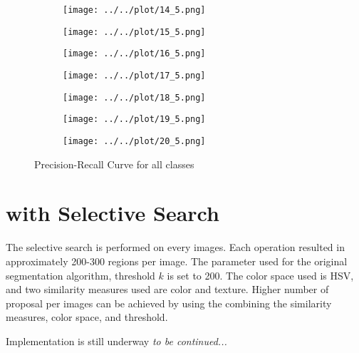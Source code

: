 \documentclass{article}
\begin{document}
\begin{figure}[H]
\begin{subfigure}[h]{0.2\textwidth}
		\texttt{[image: ../../plot/14\_5.png]}
	\end{subfigure}
	\begin{subfigure}[h]{0.2\textwidth}
		\texttt{[image: ../../plot/15\_5.png]}
	\end{subfigure}
	\begin{subfigure}[h]{0.2\textwidth}
		\texttt{[image: ../../plot/16\_5.png]}
	\end{subfigure}
	\begin{subfigure}[h]{0.2\textwidth}
		\texttt{[image: ../../plot/17\_5.png]}
	\end{subfigure}
	\begin{subfigure}[h]{0.2\textwidth}
		\texttt{[image: ../../plot/18\_5.png]}
	\end{subfigure}
	\begin{subfigure}[h]{0.2\textwidth}
		\texttt{[image: ../../plot/19\_5.png]}
	\end{subfigure}
	\begin{subfigure}[h]{0.2\textwidth}
		\texttt{[image: ../../plot/20\_5.png]}
	\end{subfigure}
	\caption{Precision-Recall Curve for all classes}
\end{figure}

\section{with Selective Search}
The selective search is performed on every images. Each operation resulted in approximately 200-300 regions per image.
The parameter used for the original segmentation algorithm, threshold $k$ is set to 200. The color space used is HSV, and two similarity measures used are color and texture.
Higher number of proposal per images can be achieved by using the combining the similarity measures, color space, and threshold.

Implementation is still underway
\emph{to be continued...}



\end{document}
